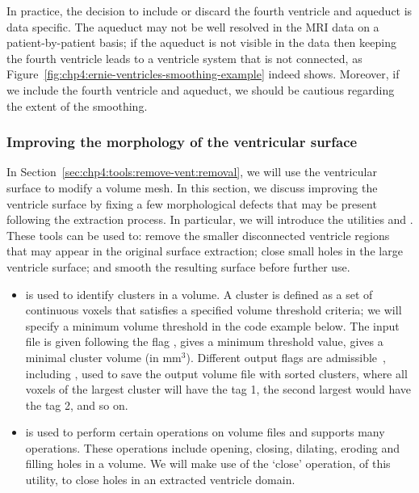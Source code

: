 In practice, the decision to include or discard the fourth ventricle
and aqueduct is data specific. The aqueduct may not be well resolved
in the MRI data on a patient-by-patient basis; if the aqueduct is not
visible in the data then keeping the fourth ventricle leads to a
ventricle system that is not connected, as
Figure~\ref{fig:chp4:ernie-ventricles-smoothing-example} indeed
shows. Moreover, if we include the fourth ventricle and aqueduct,
we should be cautious regarding the extent of the smoothing. 

\subsubsection*{Improving the morphology of the ventricular surface}
In Section~\ref{sec:chp4:tools:remove-vent:removal}, we will use the 
ventricular surface to modify a volume mesh. In this section, we discuss 
improving the ventricle surface by fixing a few morphological defects that may 
be present following the extraction process. In particular, we will introduce 
the \freesurfer{} utilities  and . 
These tools can be used to: remove the smaller disconnected ventricle regions 
that may appear in the original surface extraction; close small holes in the 
large ventricle surface; and smooth the resulting surface before further use. 

\begin{itemize}
\item
   is used to identify clusters in a volume. A
  cluster is defined as a set of continuous voxels that satisfies a
  specified volume threshold criteria; we will specify a minimum volume 
  threshold in the code example below. The input file is given following the 
  flag ,  gives a minimum threshold value,
   gives a minimal cluster volume (in
  mm$^3$). Different output flags are
  admissible~\cite{freesurfer-wiki}, including , used to
  save the output volume file with sorted clusters, where all voxels of
  the largest cluster will have the tag 1, the second largest would have
  the tag 2, and so on.
\item
   is used to perform certain operations on
  volume files and supports many operations. These operations include
  opening, closing, dilating, eroding and filling holes in a volume.
  We will make use of the `close' operation, of this utility, to close
  holes in an extracted ventricle domain.
\end{itemize}


